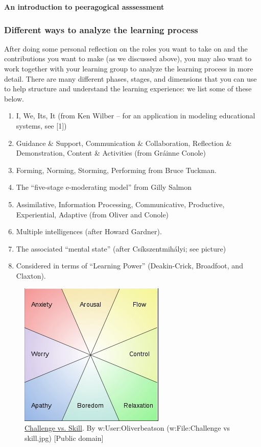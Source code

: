 \textbf{An introduction to peeragogical asssessment}

\subsubsection{Different ways to analyze the learning process}

After doing some personal reflection on the roles you want to take on
and the contributions you want to make (as we discussed above), you may
also want to work together with your learning group to analyze the
learning process in more detail. There are many different phases,
stages, and dimensions that you can use to help structure and understand
the learning experience: we list some of these below.

\begin{enumerate}
\item
  I, We, Its, It (from Ken Wilber -- for an application in modeling
  educational systems, see {[}1{]})
\item
  Guidance \& Support, Communication \& Collaboration, Reflection \&
  Demonstration, Content \& Activities (from Gráinne Conole)
\item
  Forming, Norming, Storming, Performing from Bruce Tuckman.
\item
  The ``five-stage e-moderating model'' from Gilly Salmon
\item
  Assimilative, Information Processing, Communicative, Productive,
  Experiential, Adaptive (from Oliver and Conole)
\item
  Multiple intelligences (after Howard Gardner).
\item
  The associated ``mental state'' (after Csíkszentmihályi; see picture)
\item
  Considered in terms of ``Learning Power'' (Deakin-Crick, Broadfoot,
  and Claxton).
\end{enumerate}

\begin{figure}
\begin{center}
\includegraphics[width=.6\textwidth]{../pictures/challenge.jpg}
\end{center}
\caption*{
 \href{http://commons.wikimedia.org/wiki/File\%3AChallenge\_vs\_skill.svg}{Challenge
 vs. Skill}. By w:User:Oliverbeatson (w:File:Challenge vs skill.jpg)
{[}Public domain{]}}
\end{figure}

